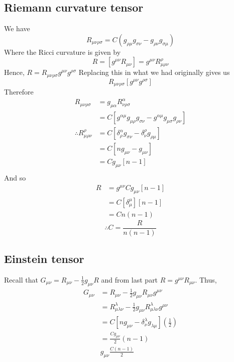 \documentclass{article}
\begin{document}
		\subsection{Riemann curvature tensor}
		We have 
		$$ R_{\mu \nu \rho \sigma } = C\left(g_{\rho \mu} g_{\sigma \nu} - g_{\rho \nu} g_{\sigma \mu} \right)$$
		Where the Ricci curvature is given by
		$$ R = [g^{\mu\nu}R_{\mu \nu} ] = g^{\mu\nu}R^\rho_{\mu\rho\nu}$$
		Hence, $R = R_{\mu\nu\rho\sigma}g^{\mu\nu}g^{\rho\sigma}$ Replacing this in what we had originally gives us
		$$R_{\mu\nu\rho\sigma} \left[ g^{\mu\nu} g^{\rho\sigma} \right] $$
		Therefore
		\begin{align*}
			R_{\mu\nu\rho\sigma} &= g_{\mu\alpha} R^\alpha_{\nu\rho\sigma}\\
			&= C \left[ g^{\alpha\mu} g_{\mu\rho} g_{\sigma \nu} - g^{\alpha \mu} g_{\mu 
			\sigma} g_{\rho \nu} \right] \\
			\therefore R^\rho_{\mu\rho\nu} &= C \left[ \delta_\rho^\alpha g_{\sigma\nu} - \delta_{\nu}^\rho g_{\rho\mu}\right] \\
			&= C \left[ n g_{\mu\nu} - g_{\mu\nu} \right] \\
			&= Cg_{\mu\nu} \left[ n-1 \right] \\
		\end{align*}
		And so
		\begin{align*}
			R &= g^{\mu\nu} C g_{\mu\nu} \left[ n-1 \right] \\
			&= C \left[ \delta_\mu^\mu \right] [n-1] \\
			&= Cn (n-1)
		\end{align*}
		$$ \therefore C = \frac{R}{n(n-1)} $$
	\pagebreak
	\subsection{Einstein tensor}
		Recall that $G_{\mu\nu} = R_{\mu\nu} - \frac12 g_{\mu\nu}R$ and from last part $R = g^{\mu\nu}R_{\mu\nu}$. Thus,
		\begin{align*}
			G_{\mu\nu} &= R_{\mu\nu} -\frac12 g_{\mu\nu}R_{\mu\nu} g^{\mu\nu} \\
			&= R^{\lambda}_{\mu\lambda\nu} - \frac12 g_{\mu\nu} R_{\mu\lambda\nu}^\lambda g^{\mu\nu} \\
			&= C \left[ n g_{\mu\nu} - \delta_\nu^\lambda g_{\lambda\mu} \right] \left(\frac12\right) \\
			&= \frac{Cg_{\mu\nu}}{2} \left( n-1 \right) \\
			& g_{\mu\nu} \frac{C(n-1)}{2}
		\end{align*}
	
\end{document}
